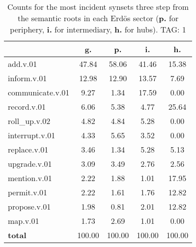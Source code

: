 \begin{table}[h!]
\begin{center}
\begin{tabular}{| l || c | c | c | c |}\hline
 & {\bf g.} & {\bf p.} & {\bf i.} & {\bf h.} \\\hline\hline
add.v.01 & 47.84  & 58.06  & 41.46  & 15.38 \\\hline
inform.v.01 & 12.98  & 12.90  & 13.57  & 7.69 \\\hline
communicate.v.01 & 9.27  & 1.34  & 17.59  & 0.00 \\\hline
record.v.01 & 6.06  & 5.38  & 4.77  & 25.64 \\\hline
roll\_up.v.02 & 4.82  & 4.84  & 5.28  & 0.00 \\\hline
interrupt.v.01 & 4.33  & 5.65  & 3.52  & 0.00 \\\hline
replace.v.01 & 3.46  & 1.34  & 5.28  & 5.13 \\\hline
upgrade.v.01 & 3.09  & 3.49  & 2.76  & 2.56 \\\hline
mention.v.01 & 2.22  & 1.88  & 1.01  & 17.95 \\\hline
permit.v.01 & 2.22  & 1.61  & 1.76  & 12.82 \\\hline
propose.v.01 & 1.98  & 0.81  & 2.01  & 12.82 \\\hline
map.v.01 & 1.73  & 2.69  & 1.01  & 0.00 \\\hline\hline
{{\bf total}} & 100.00  & 100.00  & 100.00  & 100.00 \\\hline
\end{tabular}
\caption{Counts for the most incident synsets three step from the semantic roots in each Erd\"os sector ({\bf p.} for periphery, {\bf i.} for intermediary, {\bf h.} for hubs). TAG: 1}
\end{center}
\end{table}